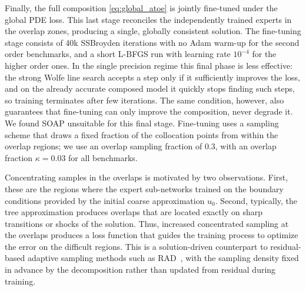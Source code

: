 Finally, the full composition \eqref{eq:global_atoe} is jointly fine-tuned under the global PDE loss. This last stage reconciles the independently trained experts in the overlap zones,
producing a single, globally consistent solution. The fine-tuning stage consists of 40k SSBroyden iterations with no Adam warm-up for the second order benchmarks, and a short L-BFGS run with learning rate $10^{-4}$ for the higher order ones. In the single precision regime this final phase is less effective: the strong Wolfe line search accepts a step only if it sufficiently improves the loss, and on the already accurate composed model it quickly stops finding such steps, so training terminates after few iterations. The same condition, however, also guarantees that fine-tuning can only improve the composition, never degrade it. We found SOAP unsuitable for this final stage. Fine-tuning uses a sampling scheme that draws a fixed fraction of the collocation points from within the overlap regions; we use an overlap sampling fraction of $0.3$, with an
overlap fraction $\kappa = 0.03$ for all benchmarks.

Concentrating samples in the overlaps is
motivated by two observations. First, these are the regions where the
expert sub-networks trained on the boundary conditions provided by the initial coarse approximation $u_0$. Second, typically, the tree approximation produces overlaps that are located exactly on sharp transitions or shocks of the solution. Thus, increased concentrated sampling at the overlaps produces a loss function that guides the  training process to optimize the error on the difficult regions. This is a solution-driven counterpart to residual-based adaptive sampling methods such as RAD~\cite{wu2023rad}, with the sampling density fixed in advance by the decomposition rather than updated from residual during training.